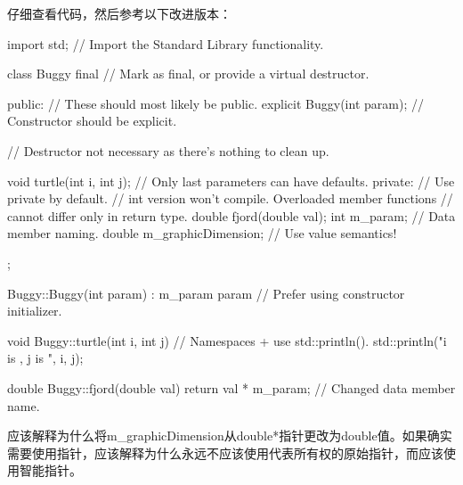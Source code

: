 仔细查看代码，然后参考以下改进版本：

\begin{cpp}
import std; // Import the Standard Library functionality.

class Buggy final // Mark as final, or provide a virtual destructor.
{
    public: // These should most likely be public.
        explicit Buggy(int param); // Constructor should be explicit.

        // Destructor not necessary as there's nothing to clean up.

        void turtle(int i, int j); // Only last parameters can have defaults.
    private: // Use private by default.
        // int version won't compile. Overloaded member functions
        // cannot differ only in return type.
        double fjord(double val);
        int m_param; // Data member naming.
        double m_graphicDimension; // Use value semantics!
};

Buggy::Buggy(int param)
: m_param{ param } // Prefer using constructor initializer.
{}

void Buggy::turtle(int i, int j)
{
    // Namespaces + use std::println().
    std::println("i is {}, j is {}", i, j);
}

double Buggy::fjord(double val)
{
    return val * m_param; // Changed data member name.
}
\end{cpp}

应该解释为什么将m\_graphicDimension从double*指针更改为double值。如果确实需要使用指针，应该解释为什么永远不应该使用代表所有权的原始指针，而应该使用智能指针。


